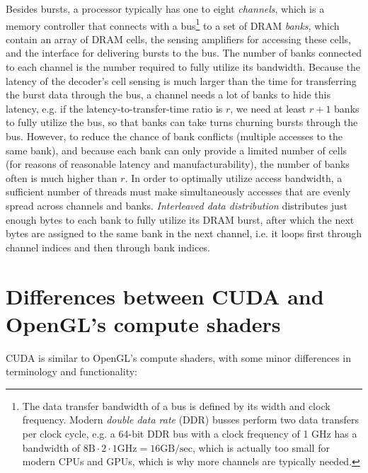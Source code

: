 \documentclass[8pt, table, xcdraw]{article}%
\begin{document}
Besides bursts, a processor typically has one to eight \emph{channels}, which is a memory controller that connects with a bus\footnote{The data transfer bandwidth of a bus is defined by its width and clock frequency. Modern \emph{double data rate} (DDR) busses perform two data transfers per clock cycle, e.g. a  64-bit DDR bus with a clock frequency of 1 GHz has a bandwidth of $8\text{B} \cdot 2 \cdot 1\text{GHz} = 16\text{GB/sec}$, which is actually too small for modern CPUs and GPUs, which is why more channels are typically needed.} to a set of DRAM \emph{banks}, which contain an array of DRAM cells, the sensing amplifiers for accessing these cells, and the interface for delivering bursts to the bus. The number of banks connected to each channel is the number required to fully utilize its bandwidth. Because the latency of the decoder's cell sensing is much larger than the time for transferring the burst data through the bus, a channel needs a lot of banks to hide this latency, e.g. if the latency-to-transfer-time ratio is $r$, we need at least $r+1$ banks to fully utilize the bus, so that banks can take turns churning bursts through the bus. However, to reduce the chance of bank conflicts (multiple accesses to the same bank), and because each bank can only provide a limited number of cells (for reasons of reasonable latency and manufacturability), the number of banks often is much higher than $r$. In order to optimally utilize access bandwidth, a sufficient number of threads must make simultaneously accesses that are evenly spread across channels and banks. \emph{Interleaved data distribution} distributes just enough bytes to each bank to fully utilize its DRAM burst, after which the next bytes are assigned to the same bank in the next channel, i.e. it loops first through channel indices and then through bank indices.

\section{Differences between CUDA and OpenGL's compute shaders}

CUDA is similar to OpenGL's compute shaders, with some minor differences in terminology and functionality:
\end{document}
